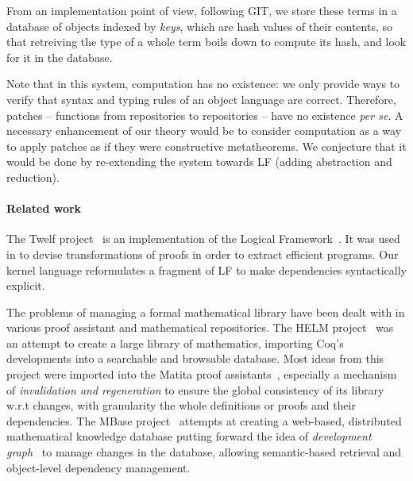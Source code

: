 \documentclass{article}
\begin{document}
From an implementation point of view, following \textsf{GIT}, we store
these terms in a database of objects indexed by \emph{keys}, which are
hash values of their contents, so that retreiving the type of a whole
term boils down to compute its hash, and look for it in the database.

Note that in this system, computation has no existence: we only
provide ways to verify that syntax and typing rules of an object
language are correct. Therefore, patches -- functions from
repositories to repositories -- have no existence \emph{per se}. A
necessary enhancement of our theory would be to consider computation
as a way to apply patches as if they were constructive
metatheorems. We conjecture that it would be done by re-extending the
system towards LF (adding abstraction and reduction).

\paragraph{Related work}
\label{rw}

The \textsf{Twelf} project~\citep{pfenning1999system} is an
implementation of the Logical
Framework~\citep{harper1993framework}. It was used in
\citep{anderson1993program} to devise transformations of proofs in
order to extract efficient programs. Our kernel language reformulates
a fragment of LF to make dependencies syntactically explicit.

The problems of managing a formal mathematical library have been dealt
with in various proof assistant and mathematical repositories. The
HELM project~\citep{asperti2006content} was an attempt to create a
large library of mathematics, importing \textsf{Coq}'s developments
into a searchable and browsable database.  Most ideas from this
project were imported into the \textsf{Matita} proof
assistants~\citep{AspertiCTZ07}, especially a mechanism of
\emph{invalidation and regeneration} to ensure the global consistency
of its library w.r.t changes, with granularity the whole definitions
or proofs and their dependencies. The MBase
project~\citep{kohlhase2001mbase} attempts at creating a web-based,
distributed mathematical knowledge database putting forward the idea
of \emph{development
  graph}~\citep{hutter2000management,autexier2000towards} to manage
changes in the database, allowing semantic-based retrieval and
object-level dependency management. 
\end{document}
